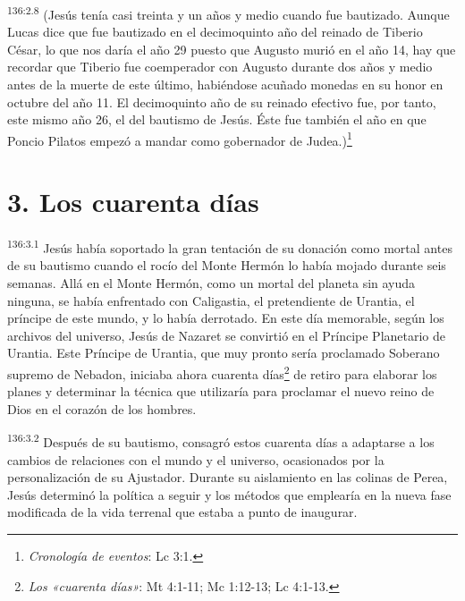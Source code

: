\par 
\textsuperscript{136:2.8} (Jesús tenía casi treinta y un años y medio cuando fue bautizado. Aunque Lucas dice que fue bautizado en el decimoquinto año del reinado de Tiberio César, lo que nos daría el año 29 puesto que Augusto murió en el año 14, hay que recordar que Tiberio fue coemperador con Augusto durante dos años y medio antes de la muerte de este último, habiéndose acuñado monedas en su honor en octubre del año 11. El decimoquinto año de su reinado efectivo fue, por tanto, este mismo año 26, el del bautismo de Jesús. Éste fue también el año en que Poncio Pilatos empezó a mandar como gobernador de Judea.)\footnote{\textit{Cronología de eventos}: Lc 3:1.}

\section*{3. Los cuarenta días}
\par 
\textsuperscript{136:3.1} Jesús había soportado la gran tentación de su donación como mortal antes de su bautismo cuando el rocío del Monte Hermón lo había mojado durante seis semanas. Allá en el Monte Hermón, como un mortal del planeta sin ayuda ninguna, se había enfrentado con Caligastia, el pretendiente de Urantia, el príncipe de este mundo, y lo había derrotado. En este día memorable, según los archivos del universo, Jesús de Nazaret se convirtió en el Príncipe Planetario de Urantia. Este Príncipe de Urantia, que muy pronto sería proclamado Soberano supremo de Nebadon, iniciaba ahora cuarenta días\footnote{\textit{Los «cuarenta días»}: Mt 4:1-11; Mc 1:12-13; Lc 4:1-13.} de retiro para elaborar los planes y determinar la técnica que utilizaría para proclamar el nuevo reino de Dios en el corazón de los hombres.

\par 
\textsuperscript{136:3.2} Después de su bautismo, consagró estos cuarenta días a adaptarse a los cambios de relaciones con el mundo y el universo, ocasionados por la personalización de su Ajustador. Durante su aislamiento en las colinas de Perea, Jesús determinó la política a seguir y los métodos que emplearía en la nueva fase modificada de la vida terrenal que estaba a punto de inaugurar.

